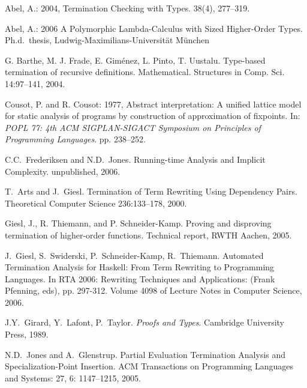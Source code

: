 \documentclass{LMCS}
\theoremstyle{definition}\newtheorem{env}[thm]{Environment}
\begin{document}
\begin{thebibliography}{MMM}

Abel, A.: 2004, Termination Checking with Types.
 { 38}(4), 277--319.

Abel, A.: 2006 A Polymorphic Lambda-Calculus with Sized Higher-Order
		  Types.
\newblock Ph.d.\ thesis, Ludwig-Maximilians-Universit\"at M\"unchen



G. Barthe, M. J. Frade, E. Gim\'{e}nez, L. Pinto, T. Uustalu.
Type-based termination of recursive definitions. 
Mathematical. Structures in Comp. Sci. 14:97--141, 
2004. 

Cousot, P. and R. Cousot: 1977, Abstract interpretation: A unified lattice
  model for static analysis of programs by construction of approximation of
  fixpoints.
\newblock In: {\em {POPL} 77: 4th {ACM} {SIGPLAN}-{SIGACT} Symposium on
  Principles of Programming Languages}. pp. 238--252.
  
C.C.\ Frederiksen and N.D.\ Jones.
Running-time Analysis and Implicit Complexity.
unpublished, 2006.


T.\ Arts and J.\ Giesl.
Termination of Term Rewriting Using Dependency Pairs. 
{Theoretical Computer Science 236:133--178}, 2000.

Giesl, J., R. Thiemann, and P. Schneider-Kamp.
Proving and disproving
  termination of higher-order functions.
\newblock Technical report, RWTH Aachen, 2005.


J.\ Giesl, S.\ Swiderski,
P.\ Schneider-Kamp, R.\ Thiemann.
Automated Termination Analysis for Haskell: From Term Rewriting
               to Programming Languages. 
In RTA 2006: Rewriting Techniques and Applications:
(Frank Pfenning, eds), 
 pp. 297-312. Volume 4098 of Lecture 
Notes in Computer Science, 2006. 



J.Y.\ Girard, Y.\ Lafont, P.\ Taylor.
{\em Proofs and Types}.
Cambridge University Press, 1989.


N.D.\ Jones and A.\ Glenstrup.
Partial Evaluation Termination Analysis and 
   Specialization-Point Insertion. 
ACM Transactions on Programming Languages and Systems: 27, 6: 1147--1215,
2005. 


\end{thebibliography}
\end{document}
